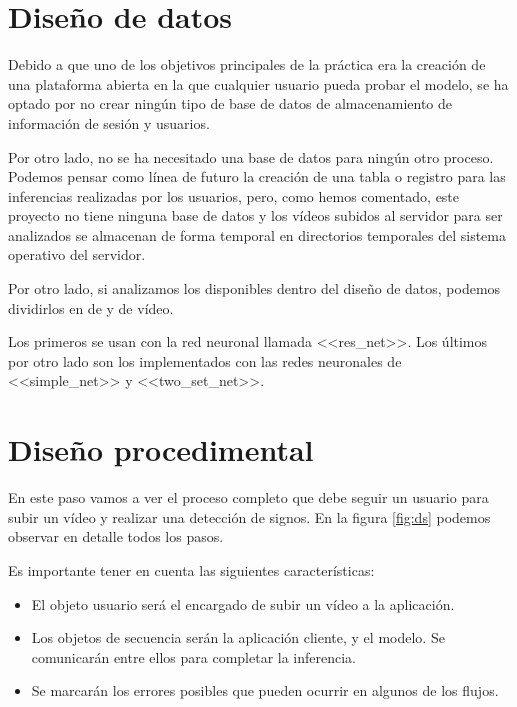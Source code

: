 
\section{Diseño de datos}

Debido a que uno de los objetivos principales de la práctica era la creación de una plataforma abierta en la que cualquier usuario pueda probar el modelo, se ha optado por no crear ningún tipo de base de datos de almacenamiento de información de sesión y usuarios.

Por otro lado, no se ha necesitado una base de datos para ningún otro proceso. Podemos pensar como línea de futuro la creación de una tabla o registro para las inferencias realizadas por los usuarios, pero, como hemos comentado, este proyecto no tiene ninguna base de datos y los vídeos subidos al servidor para ser analizados se almacenan de forma temporal en directorios temporales del sistema operativo del servidor.

Por otro lado, si analizamos los  disponibles dentro del diseño de datos, podemos dividirlos en  de  y  de vídeo.

Los primeros se usan con la red neuronal llamada <<res\_net>>. Los últimos por otro lado son los implementados con las redes neuronales de <<simple\_net>> y <<two\_set\_net>>.

\section{Diseño procedimental}

En este paso vamos a ver el proceso completo que debe seguir un usuario para subir un vídeo y realizar una detección de signos. En la figura \ref{fig:ds} podemos observar en detalle todos los pasos.

Es importante tener en cuenta las siguientes características:

\begin{itemize}
  \item El objeto usuario será el encargado de subir un vídeo a la aplicación.
  \item Los objetos de secuencia serán la aplicación cliente,  y el modelo. Se comunicarán entre ellos para completar la inferencia.
  \item Se marcarán los errores posibles que pueden ocurrir en algunos de los flujos.
\end{itemize}

